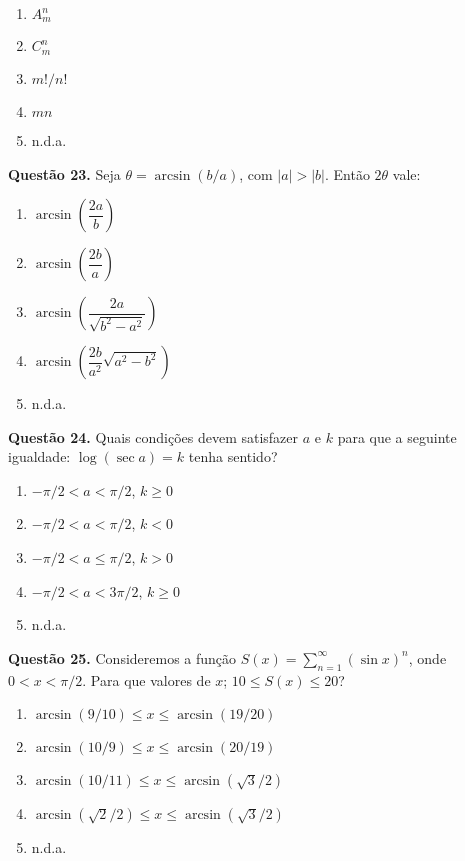 \documentclass[11pt]{article}
\begin{document}
\begin{enumerate}[\bf A (\quad)]
    \item $A_m^n$
    \item $C_m^n$
    \item $m!/n!$
    \item $mn$
    \item n.d.a.
\end{enumerate}


\textbf{Questão 23.} Seja $\theta = \arcsin (b/a)$, com $|a| > |b|$. Então $2\theta$ vale:

\begin{multicols}{3}
    \begin{enumerate}[\bf A (\quad)]
        \item $\arcsin \left( \dfrac{2a}{b} \right)$
        \item $\arcsin \left( \dfrac{2b}{a} \right)$
        \item $\arcsin \left( \dfrac{2a}{\sqrt{b^2 - a^2}} \right)$
        \item $\arcsin \left( \dfrac{2b}{a^2} \sqrt{a^2 - b^2} \right)$
        \item n.d.a.
    \end{enumerate}
\end{multicols}

\textbf{Questão 24.} Quais  condições  devem  satisfazer  $a$  e  $k$  para  que  a  seguinte igualdade: $\log (\sec a) = k$ tenha sentido? 

\begin{multicols}{3}
    \begin{enumerate}[\bf A (\quad)]
        \item $-\pi/2 < a < \pi/2$, $k \geq 0$
        \item $-\pi/2 < a < \pi/2$, $k < 0$
        \item $-\pi/2 < a \leq \pi/2$, $k > 0$
        \item $-\pi/2 < a < 3\pi/2$, $k \geq 0$
        \item n.d.a.
    \end{enumerate}
\end{multicols}

\textbf{Questão 25.} Consideremos  a  função  $S(x) = \sum\limits_{n=1}^{\infty} (\sin x)^n$,  onde  $0 < x < \pi/2$. Para que valores de $x$; $10 \leq S(x) \leq 20$? 


\begin{enumerate}[\bf A (\quad)]
    \item $\arcsin (9/10) \leq x \leq \arcsin (19/20)$
    \item $\arcsin (10/9) \leq x \leq \arcsin (20/19)$
    \item $\arcsin (10/11) \leq x \leq \arcsin (\sqrt{3}/2)$
    \item $\arcsin (\sqrt{2}/2) \leq x \leq \arcsin (\sqrt{3}/2)$
    \item n.d.a.
\end{enumerate}
\end{document}
